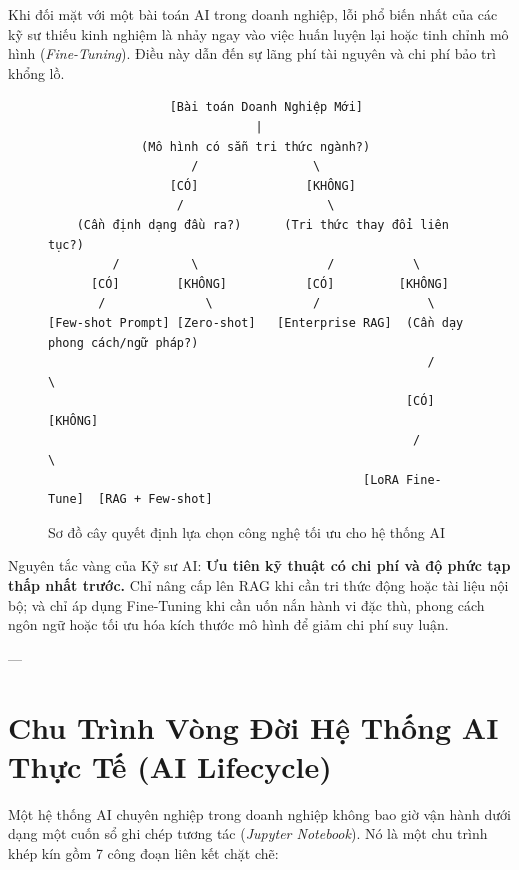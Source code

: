 Khi đối mặt với một bài toán AI trong doanh nghiệp, lỗi phổ biến nhất của các kỹ sư thiếu kinh nghiệm là nhảy ngay vào việc huấn luyện lại hoặc tinh chỉnh mô hình (\textit{Fine-Tuning}). Điều này dẫn đến sự lãng phí tài nguyên và chi phí bảo trì khổng lồ. 

\begin{figure}[htbp]
\centering
\small
\begin{verbatim}
                 [Bài toán Doanh Nghiệp Mới]
                             |
             (Mô hình có sẵn tri thức ngành?)
                    /                \
                 [CÓ]               [KHÔNG]
                  /                    \
    (Cần định dạng đầu ra?)      (Tri thức thay đổi liên tục?)
         /          \                  /           \
      [CÓ]        [KHÔNG]           [CÓ]         [KHÔNG]
       /              \              /               \
[Few-shot Prompt] [Zero-shot]   [Enterprise RAG]  (Cần dạy phong cách/ngữ pháp?)
                                                     /           \
                                                  [CÓ]         [KHÔNG]
                                                   /               \
                                            [LoRA Fine-Tune]  [RAG + Few-shot]
\end{verbatim}
\caption{Sơ đồ cây quyết định lựa chọn công nghệ tối ưu cho hệ thống AI}
\label{fig:decision-tree-ai}
\end{figure}

Nguyên tắc vàng của Kỹ sư AI: \textbf{Ưu tiên kỹ thuật có chi phí và độ phức tạp thấp nhất trước.} Chỉ nâng cấp lên RAG khi cần tri thức động hoặc tài liệu nội bộ; và chỉ áp dụng Fine-Tuning khi cần uốn nắn hành vi đặc thù, phong cách ngôn ngữ hoặc tối ưu hóa kích thước mô hình để giảm chi phí suy luận.

---

\section{Chu Trình Vòng Đời Hệ Thống AI Thực Tế (AI Lifecycle)}
\label{sec:ai-lifecycle}

Một hệ thống AI chuyên nghiệp trong doanh nghiệp không bao giờ vận hành dưới dạng một cuốn sổ ghi chép tương tác (\textit{Jupyter Notebook}). Nó là một chu trình khép kín gồm 7 công đoạn liên kết chặt chẽ:

